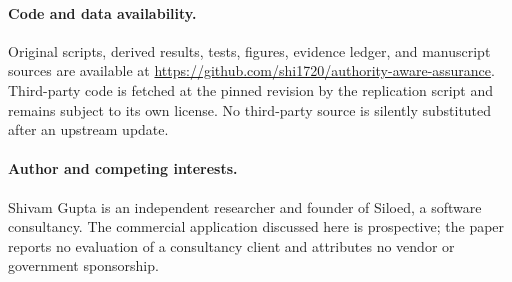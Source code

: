 \documentclass[11pt,letterpaper]{article}
\begin{document}
\paragraph{Code and data availability.} Original scripts, derived results, tests, figures, evidence ledger, and manuscript sources are available at \url{https://github.com/shi1720/authority-aware-assurance}. Third-party code is fetched at the pinned revision by the replication script and remains subject to its own license. No third-party source is silently substituted after an upstream update.
\paragraph{Author and competing interests.} Shivam Gupta is an independent researcher and founder of Siloed, a software consultancy. The commercial application discussed here is prospective; the paper reports no evaluation of a consultancy client and attributes no vendor or government sponsorship.
\end{document}
